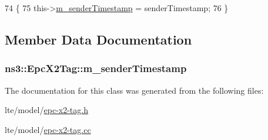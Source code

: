 \begin{DoxyCode}
74   \{
75     this->\hyperlink{classns3_1_1EpcX2Tag_adbc1447c9e4d931bfca1858244b4b4e0}{m\_senderTimestamp} = senderTimestamp;
76   \}
\end{DoxyCode}


\subsection{Member Data Documentation}
\subsubsection[{\texorpdfstring{m\+\_\+sender\+Timestamp}{m_senderTimestamp}}]{ ns3\+::\+Epc\+X2\+Tag\+::m\+\_\+sender\+Timestamp\hspace{0.3cm}{\ttfamily [private]}}\hypertarget{classns3_1_1EpcX2Tag_adbc1447c9e4d931bfca1858244b4b4e0}{}\label{classns3_1_1EpcX2Tag_adbc1447c9e4d931bfca1858244b4b4e0}


The documentation for this class was generated from the following files\+:\begin{DoxyCompactItemize}
\item 
lte/model/\hyperlink{epc-x2-tag_8h}{epc-\/x2-\/tag.\+h}\item 
lte/model/\hyperlink{epc-x2-tag_8cc}{epc-\/x2-\/tag.\+cc}\end{DoxyCompactItemize}
